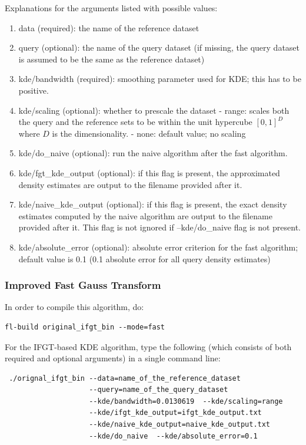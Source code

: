 \documentclass[letter]{report}
\begin{document}
Explanations for the arguments listed with possible values:

\begin{enumerate}
\item{data (required): the name of the reference dataset}
\item{query (optional): the name of the query dataset (if missing, the
 query dataset is assumed to be the same as the reference dataset)}
\item{kde/bandwidth (required): smoothing parameter used for KDE; this
 has to be positive.}
\item{kde/scaling (optional): whether to prescale the dataset - range:
scales both the query and the reference sets to be within the unit
hypercube $[0, 1]^D$ where $D$ is the dimensionality.  - none: default
value; no scaling}
\item{kde/do\_naive (optional): run the naive algorithm after the fast
algorithm.}
\item{kde/fgt\_kde\_output (optional): if this flag is present, the
approximated density estimates are output to the filename provided
after it.}
\item{kde/naive\_kde\_output (optional): if this flag is present, the
 exact density estimates computed by the naive algorithm are output to
 the filename provided after it. This flag is not ignored if
 --kde/do\_naive flag is not present.}
\item{kde/absolute\_error (optional): absolute error criterion for the
 fast algorithm; default value is 0.1 (0.1 absolute error for all
 query density estimates)}
\end{enumerate}

\subsubsection{Improved Fast Gauss Transform}
In order to compile this algorithm, do: 
\begin{verbatim}
fl-build original_ifgt_bin --mode=fast
\end{verbatim}

For the IFGT-based KDE algorithm, type the
following (which consists of both required and optional arguments) in
a single command line:
\begin{verbatim}
 ./orignal_ifgt_bin --data=name_of_the_reference_dataset
                    --query=name_of_the_query_dataset
                    --kde/bandwidth=0.0130619  --kde/scaling=range
                    --kde/ifgt_kde_output=ifgt_kde_output.txt
                    --kde/naive_kde_output=naive_kde_output.txt
                    --kde/do_naive  --kde/absolute_error=0.1
\end{verbatim}
\end{document}
